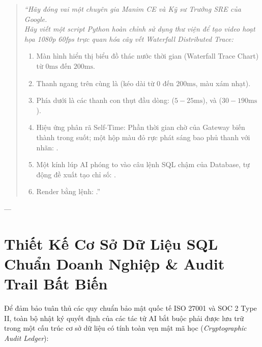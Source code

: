 \begin{simulationbox}
\begin{quote}
\small\itshape
``Hãy đóng vai một chuyên gia Manim CE và Kỹ sư Trưởng SRE của Google. \\
Hãy viết một script Python hoàn chỉnh sử dụng thư viện  để tạo video hoạt họa 1080p 60fps trực quan hóa cây vết Waterfall Distributed Trace:
\begin{enumerate}
  \item Màn hình hiển thị biểu đồ thác nước thời gian (Waterfall Trace Chart) từ $0\text{ms}$ đến $200\text{ms}$.
  \item Thanh ngang trên cùng là  (kéo dài từ $0$ đến $200\text{ms}$, màu xám nhạt).
  \item Phía dưới là các thanh con thụt đầu dòng:  ($5 - 25\text{ms}$), và  ($30 - 190\text{ms}$).
  \item Hiệu ứng phân rã Self-Time: Phần thời gian chờ của Gateway biến thành trong suốt; một hộp màu đỏ rực phát sáng bao phủ thanh  với nhãn: .
  \item Một kính lúp AI phóng to vào câu lệnh SQL chậm của Database, tự động đề xuất tạo chỉ số: .
  \item Render bằng lệnh: .''
\end{enumerate}
\end{quote}
\end{simulationbox}

---

\section{Thiết Kế Cơ Sở Dữ Liệu SQL Chuẩn Doanh Nghiệp \& Audit Trail Bất Biến}
\label{sec:ch14-database-schema}

Để đảm bảo tuân thủ các quy chuẩn bảo mật quốc tế ISO 27001 và SOC 2 Type II, toàn bộ nhật ký quyết định của các tác tử AI bắt buộc phải được lưu trữ trong một cấu trúc cơ sở dữ liệu có tính toàn vẹn mật mã học (\textit{Cryptographic Audit Ledger}):

